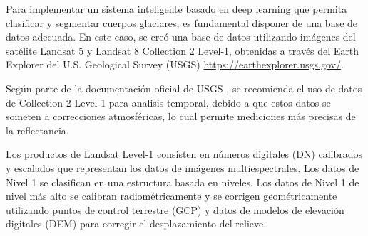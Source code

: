  
 Para implementar un sistema inteligente basado en deep learning que permita clasificar y segmentar cuerpos glaciares, es fundamental disponer de una base de datos adecuada. En este caso, se creó una base de datos utilizando imágenes del satélite Landsat 5 y Landsat 8 Collection 2 Level-1, obtenidas a través del Earth Explorer del U.S. Geological Survey (USGS) \url{https://earthexplorer.usgs.gov/}. 
 
 Según parte de la documentación oficial de USGS \parencite{usgs_landsat}, se recomienda el uso de datos de Collection 2 Level-1 para analisis temporal, debido a que estos datos se someten a correcciones atmosféricas, lo cual permite mediciones más precisas de la reflectancia. 
 
 Los productos de Landsat Level-1 consisten en números digitales (DN) calibrados y escalados que representan los datos de imágenes multiespectrales. Los datos de Nivel 1 se clasifican en una estructura basada en niveles. Los datos de Nivel 1 de nivel más alto se calibran radiométricamente y se corrigen geométricamente utilizando puntos de control terrestre (GCP) y datos de modelos de elevación digitales (DEM) para corregir el desplazamiento del relieve.

 
 
